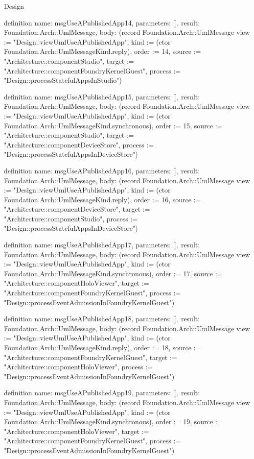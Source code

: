 \begin{lexlean}{Design}
\begin{semanticmodule}
definition{
  name: msgUseAPublishedApp14,
  parameters: [],
  result: Foundation.Arch::UmlMessage,
  body: (record Foundation.Arch::UmlMessage {view := "Design::viewUmlUseAPublishedApp", kind := (ctor Foundation.Arch::UmlMessageKind.reply), order := 14, source := "Architecture::componentStudio", target := "Architecture::componentFoundryKernelGuest", process := "Design::processStatefulAppsInStudio"})
}

definition{
  name: msgUseAPublishedApp15,
  parameters: [],
  result: Foundation.Arch::UmlMessage,
  body: (record Foundation.Arch::UmlMessage {view := "Design::viewUmlUseAPublishedApp", kind := (ctor Foundation.Arch::UmlMessageKind.synchronous), order := 15, source := "Architecture::componentStudio", target := "Architecture::componentDeviceStore", process := "Design::processStatefulAppsInDeviceStore"})
}

definition{
  name: msgUseAPublishedApp16,
  parameters: [],
  result: Foundation.Arch::UmlMessage,
  body: (record Foundation.Arch::UmlMessage {view := "Design::viewUmlUseAPublishedApp", kind := (ctor Foundation.Arch::UmlMessageKind.reply), order := 16, source := "Architecture::componentDeviceStore", target := "Architecture::componentStudio", process := "Design::processStatefulAppsInDeviceStore"})
}

definition{
  name: msgUseAPublishedApp17,
  parameters: [],
  result: Foundation.Arch::UmlMessage,
  body: (record Foundation.Arch::UmlMessage {view := "Design::viewUmlUseAPublishedApp", kind := (ctor Foundation.Arch::UmlMessageKind.synchronous), order := 17, source := "Architecture::componentHoloViewer", target := "Architecture::componentFoundryKernelGuest", process := "Design::processEventAdmissionInFoundryKernelGuest"})
}

definition{
  name: msgUseAPublishedApp18,
  parameters: [],
  result: Foundation.Arch::UmlMessage,
  body: (record Foundation.Arch::UmlMessage {view := "Design::viewUmlUseAPublishedApp", kind := (ctor Foundation.Arch::UmlMessageKind.reply), order := 18, source := "Architecture::componentFoundryKernelGuest", target := "Architecture::componentHoloViewer", process := "Design::processEventAdmissionInFoundryKernelGuest"})
}

definition{
  name: msgUseAPublishedApp19,
  parameters: [],
  result: Foundation.Arch::UmlMessage,
  body: (record Foundation.Arch::UmlMessage {view := "Design::viewUmlUseAPublishedApp", kind := (ctor Foundation.Arch::UmlMessageKind.synchronous), order := 19, source := "Architecture::componentHoloViewer", target := "Architecture::componentFoundryKernelGuest", process := "Design::processEventAdmissionInFoundryKernelGuest"})
}


\end{semanticmodule}
\end{lexlean}
